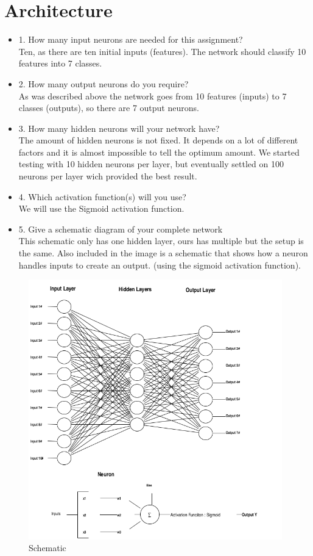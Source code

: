 
\section{Architecture} 
\label {chapter:architecture}
\begin{itemize}
\item 1. How many input neurons are needed for this assignment?\\
Ten, as there are ten initial inputs (features). The network should classify 10 features into 7 classes.
\item 2. How many output neurons do you require?\\
As was described above the network goes from 10 features (inputs) to 7 classes (outputs), so there are 7 output neurons.
\item 3. How many hidden neurons will your network have?\\
The amount of hidden neurons is not fixed. It depends on a lot of different factors and it is almost impossible to tell the optimum amount. We started testing with 10 hidden neurons per layer, but eventually settled on 100 neurons per layer wich provided the best result.
\item 4. Which activation function(s) will you use?\\
We will use the Sigmoid activation function.
\item 5. Give a schematic diagram of your complete network\\
This schematic only has one hidden layer, ours has multiple but the setup is the same. Also included in the image is a schematic that shows how a neuron handles inputs to create an output.
(using the sigmoid activation function).
\end{itemize}

\begin{figure}[!h]
\begin{center}
\includegraphics[width=11cm]{images/schemeit-project.png}
\caption{Schematic }
\label{schematic}
\end{center}
\end{figure}
\FloatBarrier

